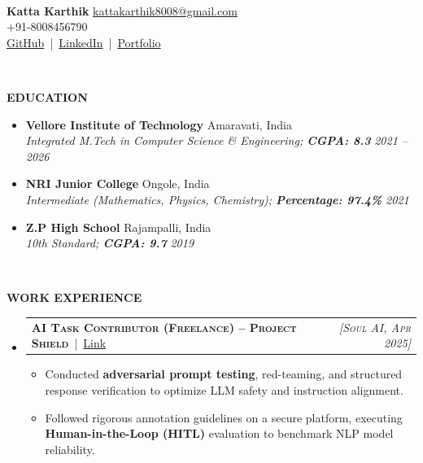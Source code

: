 \documentclass[a4paper,10pt]{article}
\makeatletter
\newcommand{\resheading}[1]{\\[-0.2cm]{\small \colorbox{mygrey}{\begin{minipage}{0.975\textwidth}{\textbf{#1}}\end{minipage}}}}
\newcommand{\ressubheading}[3]{
\begin{tabular*}{6.62in}{l @{\extracolsep{\fill}} r}
    \textsc{\textbf{#1}} \,|\, \href{#3}{Link} & \textsc{\textit{#2}} \\
\end{tabular*}\vspace{-0.2cm}}
\makeatother
\begin{document}
\hspace{0.5cm}\\[-1.8cm]

\textbf{Katta Karthik} \hspace{10cm} \href{mailto:kattakarthik8008@gmail.com}{kattakarthik8008@gmail.com}\\
 \hspace{10.53cm} {+91-8008456790} \\
 \hspace{5.8cm}
\href{https://github.com/katta-karthik}{GitHub} \,|\, \href{https://www.linkedin.com/in/katta-karthik/}{LinkedIn} \,|\, \href{https://takeuforward.org/profile/karthik0712}{Portfolio} \\
\vspace{-0.3cm}

\resheading{\textbf{EDUCATION}}

\begin{itemize}

\item
\textbf{Vellore Institute of Technology} \hfill Amaravati, India \\
\textit{Integrated M.Tech in Computer Science \& Engineering; \textbf{CGPA: 8.3}} \hfill \textit{2021 -- 2026}

\item
\textbf{NRI Junior College} \hfill Ongole, India \\
\textit{Intermediate (Mathematics, Physics, Chemistry); \textbf{Percentage: 97.4\%}} \hfill \textit{2021}

\item
\textbf{Z.P High School} \hfill Rajampalli, India \\
\textit{10th Standard; \textbf{CGPA: 9.7}} \hfill \textit{2019}

\end{itemize}

\resheading{\textbf{WORK EXPERIENCE}}

\begin{itemize}
\item \ressubheading{AI Task Contributor (Freelance) -- Project Shield}{[Soul AI, Apr 2025]}{https://drive.google.com/file/d/1rxj9jjCBWw_k7YBBMi82YyqKfKlP5Hup/view?usp=sharing}
\begin{itemize}
\item Conducted \textbf{adversarial prompt testing}, red-teaming, and structured response verification to optimize LLM safety and instruction alignment.
\item Followed rigorous annotation guidelines on a secure platform, executing \textbf{Human-in-the-Loop (HITL)} evaluation to benchmark NLP model reliability.
\end{itemize}
\end{itemize}
\end{document}
